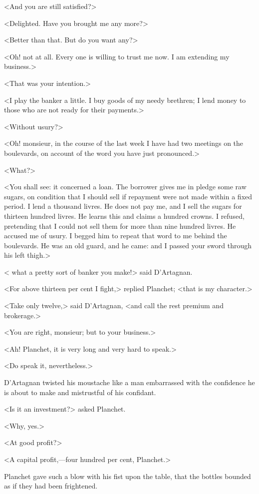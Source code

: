 <And you are still satisfied?>

<Delighted. Have you brought me any more?>

<Better than that. But do you want any?>

<Oh! not at all. Every one is willing to trust me now. I am extending my business.>

<That was your intention.>

<I play the banker a little. I buy goods of my needy brethren; I lend money to those who are not ready for their payments.>

<Without usury?>

<Oh! monsieur, in the course of the last week I have had two meetings on the boulevards, on account of the word you have just pronounced.>

<What?>

<You shall see: it concerned a loan. The borrower gives me in pledge some raw sugars, on condition that I should sell if repayment were not made within a fixed period. I lend a thousand livres. He does not pay me, and I sell the sugars for thirteen hundred livres. He learns this and claims a hundred crowns.  I refused, pretending that I could not sell them for more than nine hundred livres. He accused me of usury. I begged him to repeat that word to me behind the boulevards. He was an old guard, and he came: and I passed your sword through his left thigh.>

< what a pretty sort of banker you make!> said D'Artagnan.

<For above thirteen per cent I fight,> replied Planchet; <that is my character.>

<Take only twelve,> said D'Artagnan, <and call the rest premium and brokerage.>

<You are right, monsieur; but to your business.>

<Ah! Planchet, it is very long and very hard to speak.>

<Do speak it, nevertheless.>

D'Artagnan twisted his moustache like a man embarrassed with the confidence he is about to make and mistrustful of his confidant.

<Is it an investment?> asked Planchet.

<Why, yes.>

<At good profit?>

<A capital profit,—four hundred per cent, Planchet.>

Planchet gave such a blow with his fist upon the table, that the bottles bounded as if they had been frightened.

